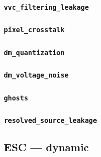 \subsubsection{\texttt{vvc\_filtering\_leakage}}
\label{sec:esc-static-vvc-filtering-leakage}


\subsubsection{\texttt{pixel\_crosstalk}}
\label{sec:esc-static-pixel-crosstalk}


\subsubsection{\texttt{dm\_quantization}}
\label{sec:esc-static-dm-quantization}


\subsubsection{\texttt{dm\_voltage\_noise}}
\label{sec:esc-static-dm-voltage-noise}


\subsubsection{\texttt{ghosts}}
\label{sec:esc-static-ghosts}


\subsubsection{\texttt{resolved\_source\_leakage}}
\label{sec:esc-static-resolved-source-leakage}


\subsection{ESC --- dynamic}
\label{sec:esc-dynamic}


